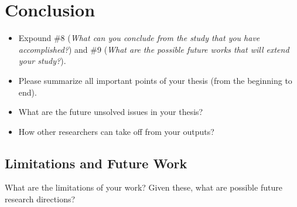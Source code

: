 \chapter{Conclusion}
\label{ch:conclusion}

\begin{itemize}
    \item Expound \#8 (\emph{What can you conclude from the study that you have accomplished?}) and \#9 (\emph{What are the possible future works that will extend your study?}).
    \item Please summarize all important points of your thesis (\ie from the beginning to end).
    \item What are the future unsolved issues in your thesis?
    \item How other researchers can take off from your outputs?
\end{itemize}

\section{Limitations and Future Work}

What are the limitations of your work? Given these, what are possible future research directions?

